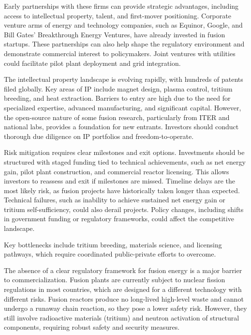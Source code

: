 \documentclass[10pt,a4paper]{article}
\begin{document}
{\small Early partnerships with these firms can provide strategic advantages, including access to intellectual property, talent, and first-mover positioning. Corporate venture arms of energy and technology companies, such as Equinor, Google, and Bill Gates' Breakthrough Energy Ventures, have already invested in fusion startups. These partnerships can also help shape the regulatory environment and demonstrate commercial interest to policymakers. Joint ventures with utilities could facilitate pilot plant deployment and grid integration.}\par
{\small The intellectual property landscape is evolving rapidly, with hundreds of patents filed globally. Key areas of IP include magnet design, plasma control, tritium breeding, and heat extraction. Barriers to entry are high due to the need for specialized expertise, advanced manufacturing, and significant capital. However, the open-source nature of some fusion research, particularly from ITER and national labs, provides a foundation for new entrants. Investors should conduct thorough due diligence on IP portfolios and freedom-to-operate.}\par
{\small Risk mitigation requires clear milestones and exit options. Investments should be structured with staged funding tied to technical achievements, such as net energy gain, pilot plant construction, and commercial reactor licensing. This allows investors to reassess and exit if milestones are missed. Timeline delays are the most likely risk, as fusion projects have historically taken longer than expected. Technical failures, such as inability to achieve sustained net energy gain or tritium self-sufficiency, could also derail projects. Policy changes, including shifts in government funding or regulatory frameworks, could affect the competitive landscape.}\par
{\small Key bottlenecks include tritium breeding, materials science, and licensing pathways, which require coordinated public-private efforts to overcome.}\par
{}\par\vspace{1pt}
{\small The absence of a clear regulatory framework for fusion energy is a major barrier to commercialization. Fusion plants are currently subject to nuclear fission regulations in most countries, which are designed for a different technology with different risks. Fusion reactors produce no long-lived high-level waste and cannot undergo a runaway chain reaction, so they pose a lower safety risk. However, they still involve radioactive materials (tritium) and neutron activation of structural components, requiring robust safety and security measures.}\par
\end{document}
